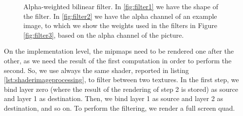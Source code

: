 \begin{figure}[!h]
\centering
{} 
\caption{Alpha-weighted bilinear filter. In \ref{fig:filter1} we have the shape of the filter. In \ref{fig:filter2} we have the alpha channel of an example image, to which we show the weights used in the filters in Figure \ref{fig:filter3}, based on the alpha channel of the picture.}
\label{fig:filters}
\end{figure}

On the implementation level, the mipmaps need to be rendered one after the other, as we need the result of the first computation in order to perform the second. So, we use always the same shader, reported in listing \ref{lst:shaderimageprocessing}, to filter between two textures. In the first step, we bind layer zero (where the result of the rendering of step 2 is stored) as source and layer 1 as destination. Then, we bind layer 1 as source and layer 2 as destination, and so on. To perform the filtering, we render a full screen quad.

